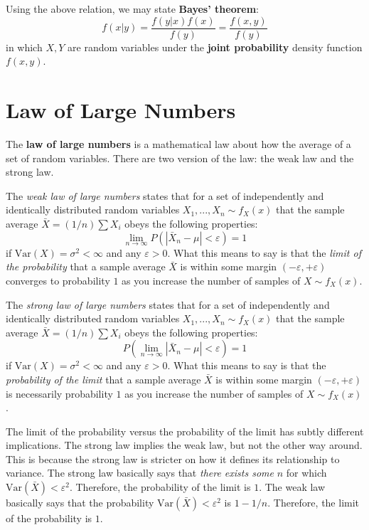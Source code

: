 \documentclass[10pt, a5paper, twoside, openright]{memoir}
\begin{document}
Using the above relation, we may state \textbf{Bayes' theorem}:
$$f(x|y) = \frac{f(y|x) f(x)}{f(y)} = \frac{f(x, y)}{f(y)}$$
in which $X, Y$ are random variables under the \textbf{joint probability} density function $f(x,y)$.

\section{Law of Large Numbers}
The \textbf{law of large numbers} is a mathematical law about how the average of a set of random variables. There are two version of the law: the weak law and the strong law.

The \textit{weak law of large numbers} states that for a set of independently and identically distributed random variables $X_1,...,X_n \sim f_X(x)$ that the sample average $\bar X = (1/n)\sum X_i$ obeys the following properties:
$$ \underset{n \rightarrow \infty}{\lim} P (|\bar X_n - \mu| < \varepsilon) = 1$$
if $\mathrm{Var}(X) = \sigma^2 < \infty$ and any $\varepsilon > 0$. What this means to say is that the \textit{limit of the probability} that a sample average $\bar X$ is within some margin $(-\varepsilon, +\varepsilon)$ converges to probability $1$ as you increase the number of samples of $X \sim f_X(x)$.

The \textit{strong law of large numbers} states that for a set of independently and identically distributed random variables $X_1,...,X_n \sim f_X(x)$ that the sample average $\bar X = (1/n)\sum X_i$ obeys the following properties:
$$ P (\underset{n \rightarrow \infty}{\lim}|\bar X_n - \mu| < \varepsilon) = 1$$
if $\mathrm{Var}(X) = \sigma^2 < \infty$ and any $\varepsilon > 0$. What this means to say is that the \textit{probability of the limit} that a sample average $\bar X$ is within some margin $(-\varepsilon, +\varepsilon)$ is necessarily probability $1$ as you increase the number of samples of $X \sim f_X(x)$.

The limit of the probability versus the probability of the limit has subtly different implications. The strong law implies the weak law, but not the other way around. This is because the strong law is stricter on how it defines its relationship to variance. The strong law basically says that \textit{there exists some} $n$ for which $\mathrm{Var}(\bar X) < \varepsilon^2$. Therefore, the probability of the limit is $1$. The weak law basically says that the probability $\mathrm{Var}(\bar X) < \varepsilon^2$ is $1-1/n$. Therefore, the limit of the probability is $1$.
\end{document}
